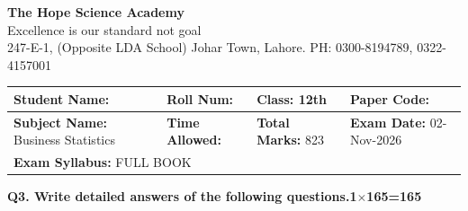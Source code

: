 \documentclass[11pt,a4paper]{article}
\begin{document}
\begin{center}
  {\Huge\bfseries The Hope Science Academy}\\[3pt]
  {\small Excellence is our standard not goal}\\[2pt]
  {\small 247-E-1, (Opposite LDA School) Johar Town, Lahore. PH: 0300-8194789, 0322-4157001}
\end{center}
\medskip\noindent
\begin{tabularx}{\linewidth}{|X|X|X|X|}
\hline
\textbf{Student Name:} & \textbf{Roll Num:} & \textbf{Class:} 12th & \textbf{Paper Code:} \\ \hline
\textbf{Subject Name:} Business Statistics & \textbf{Time Allowed:} & \textbf{Total Marks:} 823 & \textbf{Exam Date:} 02-Nov-2026 \\ \hline
\multicolumn{4}{|l|}{\textbf{Exam Syllabus:} FULL BOOK} \\ \hline
\end{tabularx}
\bigskip
\noindent\textbf{Q3. Write detailed answers of the following questions.}\hfill\textbf{1$\times$165=165}
\end{document}
